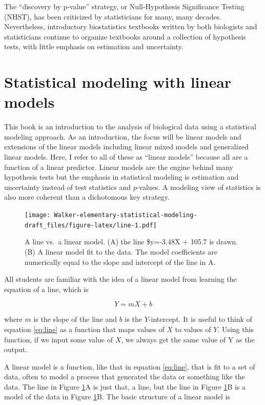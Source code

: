 \documentclass[]{book}
\theoremstyle{definition}
\theoremstyle{definition}
\theoremstyle{definition}
\theoremstyle{remark}
\begin{document}
The ``discovery by p-value'' strategy, or Null-Hypothesis Significance
Testing (NHST), has been criticized by statisticians for many, many
decades. Nevertheless, introductory biostatistics textbooks written by
both biologists and statisticians continue to organize textbooks around
a collection of hypothesis tests, with little emphasis on estimation and
uncertainty.

\section{Statistical modeling with linear
models}\label{statistical-modeling-with-linear-models}

This book is an introduction to the analysis of biological data using a
statistical modeling approach. As an introduction, the focus will be
linear models and extensions of the linear models including linear mixed
models and generalized linear models. Here, I refer to all of these as
``linear models'' because all are a function of a linear predictor.
Linear models are the engine behind many hypothesis tests but the
emphasis in statistical modeling is estimation and uncertainty instead
of test statistics and \(p\)-values. A modeling view of statistics is
also more coherent than a dichotomous key strategy.

\begin{figure}
\centering
\texttt{[image: Walker-elementary-statistical-modeling-draft\_files/figure-latex/line-1.pdf]}
\caption{\label{fig:line}A line vs.~a linear model. (A) the line \$y=-3.48X
+ 105.7 is drawn. (B) A linear model fit to the data. The model
coefficients are numerically equal to the slope and intercept of the
line in A.}
\end{figure}

All students are familiar with the idea of a linear model from learning
the equation of a line, which is

\begin{equation}
Y = mX + b
\label{eq:line}
\end{equation}

where \(m\) is the slope of the line and \(b\) is the \(Y\)-intercept.
It is useful to think of equation \eqref{eq:line} as a function that maps
values of \(X\) to values of \(Y\). Using this function, if we input
some value of \(X\), we always get the same value of Y as the output.

A linear model is a function, like that in equation \eqref{eq:line}, that
is fit to a set of data, often to model a process that generated the
data or something like the data. The line in Figure \ref{fig:line}A is
just that, a line, but the line in Figure \ref{fig:line}B is a model of
the data in Figure \ref{fig:line}B. The basic structure of a linear
model is
\end{document}
